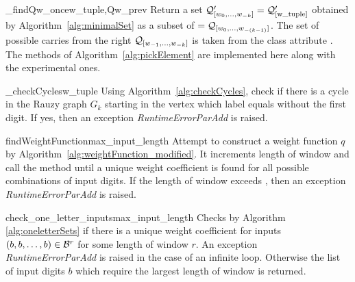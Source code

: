 \begin{method}{\_findQw\_once}{w\_tuple,Qw\_prev} 
Return a set $\mathcal{Q}_{[w_{0}, \dots, w_{-k}]}'=\mathcal{Q}'_{[\text{w\_tuple}]}$ obtained by Algorithm~\ref{alg:minimalSet} as a subset of $=\mathcal{Q}_{[w_{0}, \dots, w_{-(k-1)}]}$. The set of possible carries from the right $\mathcal{Q}_{[w_{-1}, \dots, w_{-k}]}$ is taken from the class attribute . The methods of Algorithm~\ref{alg:pickElement} are implemented here along with the experimental ones.
\end{method}

\begin{method}{\_checkCycles}{w\_tuple}
Using Algorithm~\ref{alg:checkCycles}, check if there is a cycle in the Rauzy graph $G_k$ starting in the vertex which label equals  without the first digit. If yes, then an exception \emph{RuntimeErrorParAdd} is raised. 
\end{method}


\begin{method}{findWeightFunction}{max\_input\_length}
Attempt to construct a weight function $q$ by Algorithm~\ref{alg:weightFunction_modified}. It increments length of window and call the method  until a unique weight coefficient is found for all possible combinations of input digits. If the length of window exceeds , then an exception \emph{RuntimeErrorParAdd} is raised. 
\end{method}


\begin{method}{check\_one\_letter\_inputs}{max\_input\_length}
Checks by Algorithm \ref{alg:oneletterSets} if there is a unique weight coefficient for inputs $({b,b,\dots,b})\in\mathcal{B}^r$ for some length of window $r$. An exception \emph{RuntimeErrorParAdd} is raised in the case of an infinite loop. Otherwise the list of input digits  $b$ which require the largest length of window is returned.
\end{method}




